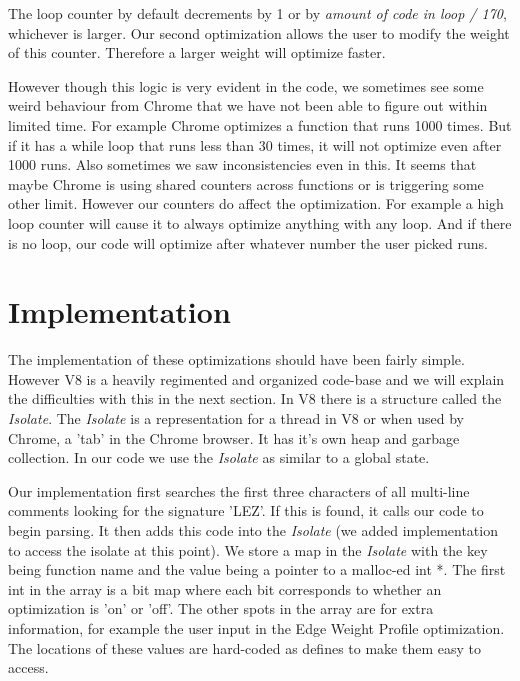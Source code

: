 \documentclass[twocolumn,showpacs,%
  nofootinbib,aps,superscriptaddress,%
  eqsecnum,prd,notitlepage,showkeys,10pt]{revtex4-1}
\begin{document}
The loop counter by default decrements by 1 or by \textit{amount of code in loop / 170}, whichever is larger. Our second optimization allows the user to modify the weight of this counter. Therefore a larger weight will optimize faster.

However though this logic is very evident in the code, we sometimes see some weird behaviour from Chrome that we have not been able to figure out within limited time. For example Chrome optimizes a function that runs 1000 times. But if it has a while loop that runs less than 30 times, it will not optimize even after 1000 runs. Also sometimes we saw inconsistencies even in this. It seems that maybe Chrome is using shared counters across functions or is triggering some other limit. However our counters do affect the optimization. For example a high loop counter will cause it to always optimize anything with any loop. And if there is no loop, our code will optimize after whatever number the user picked runs. 

\section{Implementation}
The implementation of these optimizations should have been fairly simple. However V8 is a heavily regimented and organized code-base and we will explain the difficulties with this in the next section. In V8 there is a structure called the \textit{Isolate}. The \textit{Isolate} is a representation for a thread in V8 or when used by Chrome, a 'tab' in the Chrome browser. It has it's own heap and garbage collection. In our code we use the \textit{Isolate} as similar to a global state.

Our implementation first searches the first three characters of all multi-line comments looking for the signature 'LEZ'. If this is found, it calls our code to begin parsing. It then adds this code into the \textit{Isolate} (we added implementation to access the isolate at this point). We store a map in the \textit{Isolate} with the key being function name and the value being a pointer to a malloc-ed int *. The first int in the array is a bit map where each bit corresponds to whether an optimization is 'on' or 'off'. The other spots in the array are for extra information, for example the user input in the Edge Weight Profile optimization. The locations of these values are hard-coded as defines to make them easy to access.
\end{document}
